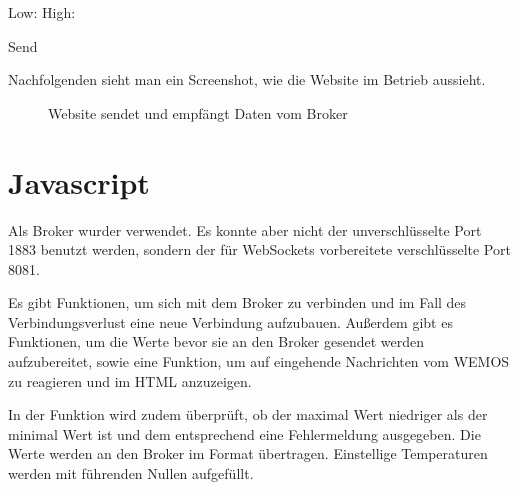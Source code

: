 \documentclass[a4paper,11pt,openany,oneside,ngerman]{sphinxmanual}
\begin{document}
\begin{sphinxVerbatim}[commandchars=\\\{\}]
     Low:
     High:    

     Send

     
\end{sphinxVerbatim}

Nachfolgenden sieht man ein Screenshot, wie die Website im Betrieb aussieht.

\begin{figure}[htbp]
\centering
\capstart

\noindent{}
\caption{Website sendet und empfängt Daten vom Broker}\label{\detokenize{webpage:id1}}\end{figure}


\section{Javascript}
\label{\detokenize{webpage:javascript}}
Als Broker wurder  verwendet. Es konnte aber nicht der
unverschlüsselte Port 1883 benutzt werden, sondern der für WebSockets
vorbereitete verschlüsselte Port 8081.

Es gibt Funktionen, um sich mit dem Broker zu verbinden und im Fall des
Verbindungsverlust eine neue Verbindung aufzubauen. Außerdem gibt es Funktionen,
um die Werte bevor sie an den Broker gesendet werden aufzubereitet, sowie eine
Funktion, um auf eingehende Nachrichten vom WEMOS zu reagieren und im HTML
anzuzeigen.

In der Funktion  wird zudem überprüft, ob der maximal Wert niedriger
als der minimal Wert ist und dem entsprechend eine Fehlermeldung ausgegeben. Die
Werte werden an den Broker im Format  übertragen. Einstellige
Temperaturen werden mit führenden Nullen aufgefüllt.
\end{document}
